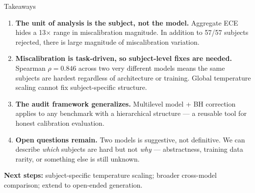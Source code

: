 \documentclass[aspectratio=169,11pt]{beamer}
\begin{document}
\begin{frame}{Takeaways}

\begin{enumerate}
  \item \textbf{The unit of analysis is the subject, not the model.}
    Aggregate ECE hides a 13$\times$ range in miscalibration magnitude.
    In addition to 57/57 subjects rejected, there is large magnitude of miscalibration variation.

  \vspace{0.4em}
  \item \textbf{Miscalibration is task-driven, so subject-level fixes are needed.}
    Spearman $\rho = 0.846$ across two very different models means the same subjects
    are hardest regardless of architecture or training.
    Global temperature scaling cannot fix subject-specific structure.

  \vspace{0.4em}
  \item \textbf{The audit framework generalizes.}
    Multilevel model + BH correction applies to any benchmark with
    a hierarchical structure --- a reusable tool for honest calibration evaluation.

  \vspace{0.4em}
  \item \textbf{Open questions remain.}
    Two models is suggestive, not definitive. We can describe \emph{which} subjects
    are hard but not \emph{why} --- abstractness, training data rarity, or something
    else is still unknown.
\end{enumerate}

\vspace{0.4em}
\textbf{Next steps:} subject-specific temperature scaling; broader cross-model
comparison; extend to open-ended generation.

\end{frame}
\end{document}
